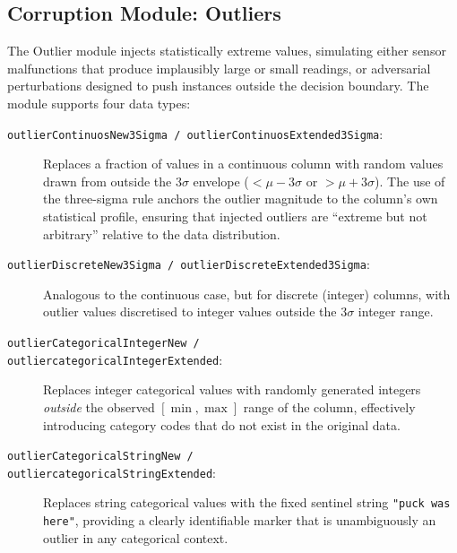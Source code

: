 \subsection{Corruption Module: Outliers}
\label{sec:pucktrick-outliers}

The Outlier module injects statistically extreme values, simulating either
sensor malfunctions that produce implausibly large or small readings, or
adversarial perturbations designed to push instances outside the decision
boundary.  The module supports four data types:

\begin{description}
    \item[\texttt{outlierContinuosNew3Sigma / outlierContinuosExtended3Sigma}:]
        Replaces a fraction of values in a continuous column with random values
        drawn from outside the $3\sigma$ envelope
        ($< \mu - 3\sigma$ or $> \mu + 3\sigma$).  The use of the three-sigma
        rule anchors the outlier magnitude to the column's own statistical
        profile, ensuring that injected outliers are ``extreme but not
        arbitrary'' relative to the data distribution.

    \item[\texttt{outlierDiscreteNew3Sigma / outlierDiscreteExtended3Sigma}:]
        Analogous to the continuous case, but for discrete (integer) columns,
        with outlier values discretised to integer values outside the
        $3\sigma$ integer range.

    \item[\texttt{outlierCategoricalIntegerNew /}]
    \item[\texttt{outliercategoricalIntegerExtended}:]
        Replaces integer categorical values with randomly generated integers
        \emph{outside} the observed $[\min, \max]$ range of the column,
        effectively introducing category codes that do not exist in the
        original data.

    \item[\texttt{outlierCategoricalStringNew /}]
    \item[\texttt{outliercategoricalStringExtended}:]
        Replaces string categorical values with the fixed sentinel string
        \texttt{"puck was here"}, providing a clearly identifiable marker that
        is unambiguously an outlier in any categorical context.
\end{description}

